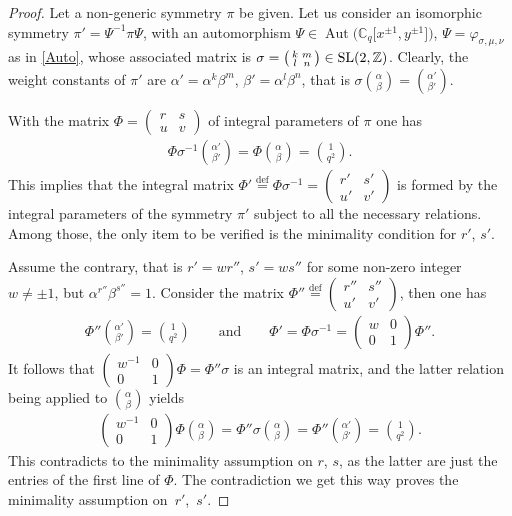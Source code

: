 \documentclass[pdftex]{sigma}
\numberwithin{equation}{section}
\begin{document}
\begin{proof} Let a non-generic symmetry $\pi$ be given. Let us consider an isomorphic symmetry $\pi'=\Psi^{-1}\pi\Psi$, with an automorphism $\Psi\in\operatorname{Aut}\big(\mathbb{C}_q\big[x^{\pm 1},y^{\pm 1}\big]\big)$, $\Psi=\varphi_{\sigma,\mu,\nu}$ as in \eqref{Auto}, whose associated matrix is $\sigma=\left(\begin{smallmatrix}k & m\\ l & n\end{smallmatrix}\right)\in {\rm SL}(2,\mathbb{Z})$. Clearly, the weight constants of $\pi'$ are $\alpha'=\alpha^k\beta^m$, $\beta'=\alpha^l\beta^n$, that is $\sigma\binom\alpha\beta=\binom{\alpha'}{\beta'}$.

With the matrix $\Phi=\left(\begin{smallmatrix}r & s\\ u & v\end{smallmatrix}\right)$ of integral parameters of $\pi$ one has
\begin{gather*}
\Phi\sigma^{-1}\binom{\alpha'}{\beta'}=\Phi\binom\alpha\beta=\binom{1}{q^2}.
\end{gather*}
This implies that the integral matrix $\Phi'\stackrel{\mathrm{def}}{=}\Phi\sigma^{-1}=\left(\begin{smallmatrix}r' & s'\\ u' & v'\end{smallmatrix}\right)$ is formed by the integral parameters of the symmetry $\pi'$ subject to all the necessary relations. Among those, the only item to be verified is the minimality condition for $r'$, $s'$.

Assume the contrary, that is $r'=wr''$, $s'=ws''$ for some non-zero integer $w\ne\pm 1$, but $\alpha^{r''}\beta^{s''}=1$. Consider the matrix $\Phi''\stackrel{\mathrm{def}}{=}\left(\begin{smallmatrix}r'' & s''\\ u' & v'\end{smallmatrix}\right)$, then one has
\begin{gather*}
\Phi''\binom{\alpha'}{\beta'}=\binom{1}{q^2}\qquad\text{and}\qquad
\Phi'=\Phi\sigma^{-1}=\begin{pmatrix}w & 0\\ 0 & 1\end{pmatrix}\Phi''.
\end{gather*}
It follows that $\left(\begin{smallmatrix}w^{-1} & 0\\ 0 & 1\end{smallmatrix}\right)\Phi=\Phi''\sigma$ is an integral matrix, and the latter relation being applied to $\binom\alpha\beta$ yields
\begin{gather*}
\begin{pmatrix}w^{-1} & 0\\ 0 & 1\end{pmatrix}\Phi\binom\alpha\beta=\Phi''\sigma\binom\alpha\beta=
\Phi''\binom{\alpha'}{\beta'}=\binom{1}{q^2}.
\end{gather*}
This contradicts to the minimality assumption on $r$, $s$, as the latter are just the entries of the first line of $\Phi$. The contradiction we get this way proves the minimality assumption on~$r'$,~$s'$.


\end{proof}
\end{document}
